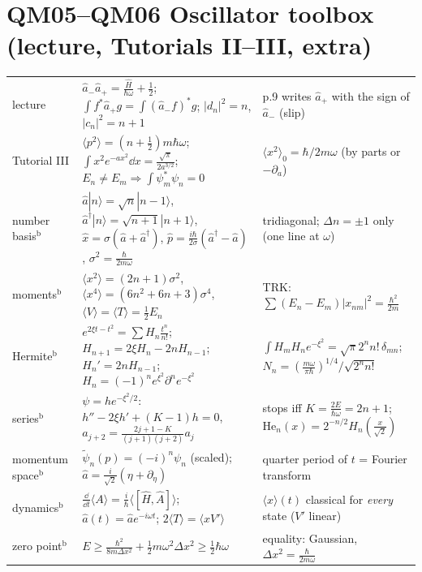 \documentclass[9pt]{article}
\begin{document}
\section*{QM05--QM06 Oscillator toolbox (lecture, Tutorials II--III, extra)}
\begin{tabular}{@{}p{2.8cm}p{8.3cm}p{6.3cm}@{}}
\toprule
lecture & $\hat a_-\hat a_+=\tfrac{\hat H}{\hbar\omega}+\tfrac12$; $\int f^*\hat a_+g=\int(\hat a_-f)^*g$; $|d_n|^2=n$, $|c_n|^2=n+1$ & p.9 writes $\hat a_+$ with the sign of $\hat a_-$ (slip)\\
Tutorial III & $\langle p^2\rangle=(n+\tfrac12)m\hbar\omega$; $\int x^2e^{-ax^2}\dd x=\tfrac{\sqrt\pi}{2a^{3/2}}$; $E_n\ne E_m\Rightarrow\int\psi_m^*\psi_n=0$ & $\langle x^2\rangle_0=\hbar/2m\omega$ (by parts or $-\partial_a$)\\
number basis$^{\text{b}}$ & $\hat a|n\rangle=\sqrt n|n{-}1\rangle$, $\hat a^\dagger|n\rangle=\sqrt{n{+}1}|n{+}1\rangle$, $\hat x=\sigma(\hat a{+}\hat a^\dagger)$, $\hat p=\tfrac{i\hbar}{2\sigma}(\hat a^\dagger{-}\hat a)$, $\sigma^2=\tfrac\hbar{2m\omega}$ & tridiagonal; $\Delta n=\pm1$ only (one line at $\omega$)\\
moments$^{\text{b}}$ & $\langle x^2\rangle=(2n{+}1)\sigma^2$, $\langle x^4\rangle=(6n^2{+}6n{+}3)\sigma^4$, $\langle V\rangle=\langle T\rangle=\tfrac12E_n$ & TRK: $\sum(E_n{-}E_m)|x_{nm}|^2=\tfrac{\hbar^2}{2m}$\\
Hermite$^{\text{b}}$ & $e^{2\xi t-t^2}=\sum H_n\tfrac{t^n}{n!}$; $H_{n+1}=2\xi H_n-2nH_{n-1}$; $H_n'=2nH_{n-1}$; $H_n=(-1)^ne^{\xi^2}\partial^ne^{-\xi^2}$ & $\int H_mH_ne^{-\xi^2}=\sqrt\pi2^nn!\,\delta_{mn}$; $N_n=(\tfrac{m\omega}{\pi\hbar})^{1/4}/\sqrt{2^nn!}$\\
series$^{\text{b}}$ & $\psi=he^{-\xi^2/2}$: $h''-2\xi h'+(K-1)h=0$, $a_{j+2}=\tfrac{2j+1-K}{(j+1)(j+2)}a_j$ & stops iff $K=\tfrac{2E}{\hbar\omega}=2n+1$; $\mathrm{He}_n(x)=2^{-n/2}H_n(\tfrac x{\sqrt2})$\\
momentum space$^{\text{b}}$ & $\tilde\psi_n(p)=(-i)^n\psi_n$ (scaled); $\hat a=\tfrac i{\sqrt2}(\eta+\partial_\eta)$ & quarter period of $t$ = Fourier transform\\
dynamics$^{\text{b}}$ & $\tfrac{\dd}{\dd t}\langle A\rangle=\tfrac i\hbar\langle[\hat H,\hat A]\rangle$; $\hat a(t)=\hat ae^{-i\omega t}$; $2\langle T\rangle=\langle xV'\rangle$ & $\langle x\rangle(t)$ classical for \emph{every} state ($V'$ linear)\\
zero point$^{\text{b}}$ & $E\ge\tfrac{\hbar^2}{8m\Delta x^2}+\tfrac12m\omega^2\Delta x^2\ge\tfrac12\hbar\omega$ & equality: Gaussian, $\Delta x^2=\tfrac\hbar{2m\omega}$\\

\end{tabular}
\end{document}
